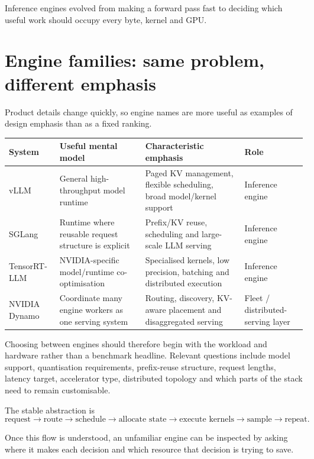 \begin{calloutmemoryhook}
Inference engines evolved from making a forward pass fast to deciding which useful work should occupy every byte, kernel and GPU.
\end{calloutmemoryhook}


\section{Engine families: same problem, different emphasis}
\label{sec:inference-engine-families}
Product details change quickly, so engine names are more useful as examples of design emphasis than as a fixed ranking.

\begin{center}
\small
\begin{tabularx}{.98\linewidth}{@{}L{.18\linewidth}L{.27\linewidth}YY@{}}
\toprule
\textbf{System} & \textbf{Useful mental model} & \textbf{Characteristic emphasis} & \textbf{Role} \\
\midrule
vLLM
& General high-throughput model runtime
& Paged KV management, flexible scheduling, broad model/kernel support
& Inference engine \\
SGLang
& Runtime where reusable request structure is explicit
& Prefix/KV reuse, scheduling and large-scale LLM serving
& Inference engine \\
TensorRT-LLM
& NVIDIA-specific model/runtime co-optimisation
& Specialised kernels, low precision, batching and distributed execution
& Inference engine \\
NVIDIA Dynamo
& Coordinate many engine workers as one serving system
& Routing, discovery, KV-aware placement and disaggregated serving
& Fleet / distributed-serving layer \\
\bottomrule
\end{tabularx}
\end{center}

Choosing between engines should therefore begin with the workload and hardware rather than a benchmark headline.
Relevant questions include model support, quantisation requirements, prefix-reuse structure, request lengths, latency target, accelerator type, distributed topology and which parts of the stack need to remain customisable.

The stable abstraction is
\[
\boxed{
\text{request}
\rightarrow
\text{route}
\rightarrow
\text{schedule}
\rightarrow
\text{allocate state}
\rightarrow
\text{execute kernels}
\rightarrow
\text{sample}
\rightarrow
\text{repeat}.
}
\]

Once this flow is understood, an unfamiliar engine can be inspected by asking where it makes each decision and which resource that decision is trying to save.